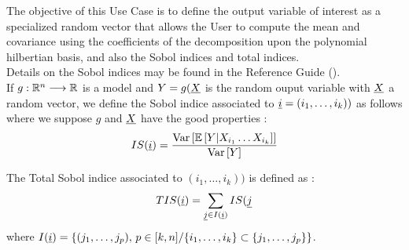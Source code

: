 \renewcommand{\filename}{docUC_OVI_SpecializedPolyChaosExp.tex}
\renewcommand{\filetitle}{UC : Creation of a specialized random vector for the global sensitivity analysis using a polynomial chaos expansion}

\HeaderIIILevel

\label{FunctionalChaosRandomVector}


The objective of this Use Case is to define the output variable of interest as a specialized random vector that allows the User to compute the mean and covariance using the coefficients of the  decomposition upon the polynomial hilbertian basis, and also the Sobol indices and total indices.\\


Details on the Sobol indices may be found in the Reference Guide ().\\

If $g : {\mathbb R}^n \longrightarrow {\mathbb R}$ is a model and $Y = g({\underline{X}}$ is the random ouput variable with ${\underline{X}}$ a random vector, we define the Sobol indice associated to ${\underline{i}} = (i_1, \dots, i_k) )$ as follows where we suppose $g$ and ${\underline{X}}$ have the good properties :
\begin{align*}
  IS({\underline{i}}) = \displaystyle \frac{{\rm Var}\left[ {\mathbb E}\left[ Y|X_{i_1} \dots X_{i_k} \right] \right]}{{\rm Var}\left[ Y \right]}
\end{align*}

The Total Sobol indice associated to $(i_1, \dots, i_k) )$ is defined as :
\begin{align*}
  \displaystyle TIS({\underline{i}}) = \sum_{{\underline{j}} \in I({\underline{i}})} IS({\underline{j}}
\end{align*}
where $I({\underline{i}}) = \left\{ (j_1, \dots, j_p), \, p \in [k,n]/ \{i_1, \dots, i_k\} \subset  \{j_1, \dots, j_p\}  \right\}$.\\



